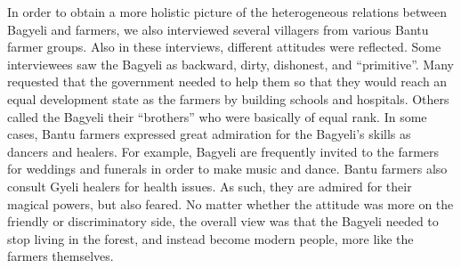 In order to obtain a more holistic picture of the heterogeneous relations between Bagyeli and farmers, we also interviewed several villagers from various Bantu farmer groups. Also in these interviews, different attitudes were reflected. Some interviewees saw the Bagyeli as backward, dirty, dishonest, and ``primitive''. Many requested that the government needed to help them so that they would reach an equal development state as the farmers by building schools and hospitals. Others called the Bagyeli their ``brothers'' who were basically of equal rank. In some cases, Bantu farmers expressed great admiration for the Bagyeli's skills as dancers and healers. For example, Bagyeli are frequently invited to the farmers for weddings and funerals in order to make music and dance. Bantu farmers also consult Gyeli healers for health issues. As such, they are admired for their magical powers, but also feared.
No matter whether the attitude was more on the friendly or discriminatory side, the overall view was that the Bagyeli needed to stop living in the forest, and instead become modern people, more like the farmers themselves. 


